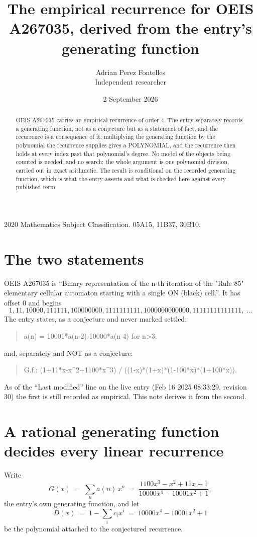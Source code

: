 \documentclass[11pt,a4paper]{article}
\title{The empirical recurrence for OEIS A267035, derived from the entry's generating function}
\author{Adrian Perez Fontelles\\ \small Independent researcher}
\date{2 September 2026}
\theoremstyle{plain}
\theoremstyle{definition}
\begin{document}
\maketitle

\begin{abstract}
OEIS A267035 carries an empirical recurrence of order $4$. The entry separately records a
generating function, not as a conjecture but as a statement of fact, and the recurrence is a
consequence of it: multiplying the generating function by the polynomial the recurrence
supplies gives a POLYNOMIAL, and the recurrence then holds at every index past that
polynomial's degree. No model of the objects being counted is needed, and no search: the
whole argument is one polynomial division, carried out in exact arithmetic. The result is
conditional on the recorded generating function, which is what the entry asserts and what is
checked here against every published term.
\end{abstract}

\noindent\small 2020 Mathematics Subject Classification. 05A15, 11B37, 30B10.\normalsize

\section{The two statements}

OEIS A267035 is ``Binary representation of the n-th iteration of the "Rule 85" elementary cellular automaton starting with a single ON (black) cell.''. It has offset $0$ and begins
\[
1, 11, 10000, 111111, 100000000, 1111111111, 1000000000000, 11111111111111,\ \dots
\]
The entry states, as a conjecture and never marked settled:
\begin{quote}
a(n) = 10001*a(n-2)-10000*a(n-4) for n>3.
\end{quote}
and, separately and NOT as a conjecture:
\begin{quote}
G.f.: (1+11*x-x\^{}2+1100*x\^{}3) / ((1-x)*(1+x)*(1-100*x)*(1+100*x)).
\end{quote}
As of the ``Last modified'' line on the live entry (Feb 16 2025 08:33:29, revision 30) the first is still
recorded as empirical. This note derives it from the second.

\section{A rational generating function decides every linear recurrence}

Write
\[
G(x)\;=\;\sum_{n}a(n)\,x^{n}\;=\;\frac{1100 x^{3} - x^{2} + 11 x + 1}{10000 x^{4} - 10001 x^{2} + 1},
\]
the entry's own generating function, and let
\[
D(x)\;=\;1-\sum_i c_i x^{i}\;=\;10000 x^{4} - 10001 x^{2} + 1
\]
be the polynomial attached to the conjectured recurrence.
\end{document}
